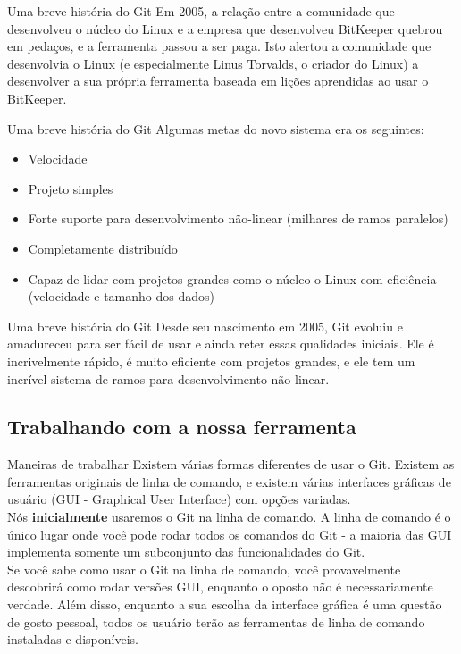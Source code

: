 \documentclass{beamer}
\begin{document}
\begin{frame}{Uma breve história do Git} \justifying
      Em 2005, a relação entre a comunidade que desenvolveu o núcleo do Linux e a empresa que desenvolveu BitKeeper quebrou em pedaços, e a ferramenta passou a ser paga. Isto alertou a comunidade que desenvolvia o Linux (e especialmente Linus Torvalds, o criador do Linux) a desenvolver a sua própria ferramenta baseada em lições aprendidas ao usar o BitKeeper. 
\end{frame}

\begin{frame}{Uma breve história do Git} \justifying
      Algumas metas do novo sistema era os seguintes:
      \begin{itemize}
            \item Velocidade
            \item Projeto simples
            \item Forte suporte para desenvolvimento não-linear (milhares de ramos paralelos)
            \item Completamente distribuído
            \item Capaz de lidar com projetos grandes como o núcleo o Linux com eficiência (velocidade e tamanho dos dados)
      \end{itemize}
\end{frame}

\begin{frame}{Uma breve história do Git} \justifying
      Desde seu nascimento em 2005, Git evoluiu e amadureceu para ser fácil de usar e ainda reter essas qualidades iniciais. Ele é incrivelmente rápido, é muito eficiente com projetos grandes, e ele tem um incrível sistema de ramos para desenvolvimento não linear.
\end{frame}


\subsection{Trabalhando com a nossa ferramenta}

\begin{frame}{Maneiras de trabalhar}\justifying
      Existem várias formas diferentes de usar o Git. Existem as ferramentas originais de linha de comando, e existem várias interfaces gráficas de usuário (GUI - Graphical User Interface) com opções variadas.\\ Nós \textbf{inicialmente} usaremos o Git na linha de comando. 
      A linha de comando é o único lugar onde você pode rodar todos os comandos do Git - 
      a maioria das GUI implementa somente um subconjunto das funcionalidades do Git. 
      \\Se você sabe como usar o Git na linha de comando, você provavelmente descobrirá como 
      rodar versões GUI, enquanto o oposto não é necessariamente verdade. 
      Além disso, enquanto a sua escolha da interface gráfica é uma questão de gosto pessoal, todos os usuário terão as ferramentas de linha de comando instaladas e disponíveis.
\end{frame}
\end{document}
